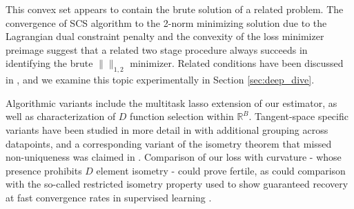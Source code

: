 This convex set appears to contain the brute solution of a related problem.
The convergence of SCS algorithm to the 2-norm minimizing solution due to the Lagrangian dual constraint penalty and the convexity of the loss minimizer preimage suggest that a related two stage procedure always succeeds in identifying the brute $\|\|_{1,2}$ minimizer.
Related conditions have been discussed in \citet{Donoho2006ForML, Mishkin2022TheSP}, and we examine this topic experimentally in Section \ref{sec:deep_dive}.

Algorithmic variants include the multitask lasso \citep{ Hastie2015-qa} extension of our estimator, as well as characterization of $D$ function selection within $\mathbb R^B$.
Tangent-space specific variants have been studied in more detail in \citet{Koelle2022-ju, Koelle2024-no} with additional grouping across datapoints, and a corresponding variant of the isometry theorem that missed non-uniqueness was claimed in \citet{Koelle2022-lp}.
Comparison of our loss with curvature - whose presence prohibits $D$ element isometry - could prove fertile, as could comparison with the so-called restricted isometry property used to show guaranteed recovery at fast convergence rates in supervised learning \citep{Candes2005-dd, Hastie2015-qa}.


